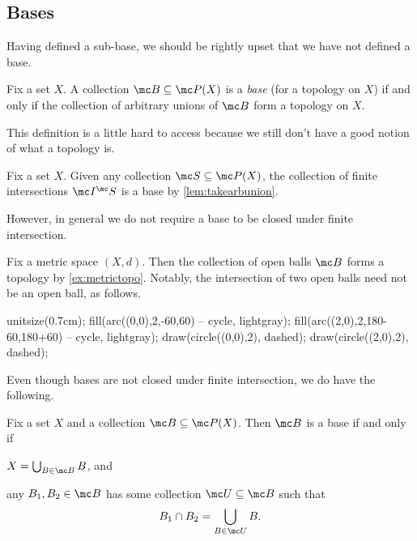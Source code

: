 \documentclass[../notes.tex]{subfiles}
\begin{document}
\subsection{Bases}
Having defined a sub-base, we should be rightly upset that we have not defined a base.
\begin{definition}[Base]
	Fix a set $X$. A collection $\mc B\subseteq\mc P(X)$ is a \textit{base} (for a topology on $X$) if and only if the collection of arbitrary unions of $\mc B$ form a topology on $X$.
\end{definition}
This definition is a little hard to access because we still don't have a good notion of what a topology is.
\begin{example} \label{ex:fininterisbase}
	Fix a set $X$. Given any collection $\mc S\subseteq\mc P(X)$, the collection of finite intersections $\mc I^\mc S$ is a base by \autoref{lem:takearbunion}.
\end{example}
However, in general we do not require a base to be closed under finite intersection.
\begin{example}
	Fix a metric space $(X,d)$. Then the collection of open balls $\mc B$ forms a topology by \autoref{ex:metrictopo}. Notably, the intersection of two open balls need not be an open ball, as follows.
	\begin{center}
		\begin{asy}
			unitsize(0.7cm);
			fill(arc((0,0),2,-60,60) -- cycle, lightgray);
			fill(arc((2,0),2,180-60,180+60) -- cycle, lightgray);
			draw(circle((0,0),2), dashed);
			draw(circle((2,0),2), dashed);
		\end{asy}
	\end{center}
\end{example}
Even though bases are not closed under finite intersection, we do have the following.
\begin{prop}
	Fix a set $X$ and a collection $\mc B\subseteq\mc P(X)$. Then $\mc B$ is a base if and only if
	\begin{listalph}
		\item $X=\bigcup_{B\in\mc B}B$, and
		\item any $B_1,B_2\in\mc B$ has some collection $\mc U\subseteq\mc B$ such that
		\[B_1\cap B_2=\bigcup_{B\in\mc U}B.\]
	\end{listalph}
\end{prop}
\end{document}
